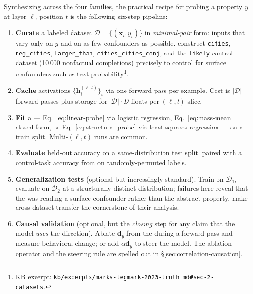Synthesizing across the four  families, the practical recipe for
probing a property $y$ at layer $\ell$, position $t$ is the following
six-step pipeline:
\begin{enumerate}
  \item \textbf{Curate} a labeled dataset
    $\mathcal{D} = \{(\mathbf{x}_i, y_i)\}$ in \emph{minimal-pair} form:
    inputs that vary only on $y$ and on as few confounders as possible.
    \citet[\S 2]{marks-tegmark-2023-truth} construct
    \texttt{cities}, \texttt{neg\_cities}, \texttt{larger\_than},
    \texttt{cities\_cities\_conj}, and the \texttt{likely} control
    dataset (10\,000 nonfactual completions) precisely to control for
    surface confounders such as text probability\footnote{KB excerpt:
    \nolinkurl{kb/excerpts/marks-tegmark-2023-truth.md#sec-2-datasets}.}.
  \item \textbf{Cache} activations $\{\mathbf{h}^{(\ell, t)}_i\}_i$ via
    one forward pass per example. Cost is $|\mathcal{D}|$ forward
    passes plus storage for $|\mathcal{D}| \cdot D$ floats per
    $(\ell, t)$ slice.
  \item \textbf{Fit} a  — Eq.~\eqref{eq:linear-probe} via logistic
    regression, Eq.~\eqref{eq:mass-mean} closed-form, or
    Eq.~\eqref{eq:structural-probe} via least-squares regression — on a
    train split. Multi-$(\ell, t)$ runs are common.
  \item \textbf{Evaluate} held-out accuracy on a same-distribution test
    split, paired with a control-task accuracy from
    \citet{hewitt2019-control-tasks} on randomly-permuted labels.
  \item \textbf{Generalization tests} (optional but increasingly
    standard). Train on $\mathcal{D}_1$, evaluate on $\mathcal{D}_2$ at
    a structurally distinct distribution; failures here reveal that
    the  was reading a surface confounder rather than the abstract
    property. \citet[\S 1, \S 4]{marks-tegmark-2023-truth} make
    cross-dataset transfer the cornerstone of their analysis.
  \item \textbf{Causal validation} (optional, but the \emph{closing}
    step for any claim that the model \emph{uses} the  direction).
    Ablate $\mathbf{d}_y$ from the  during a forward pass
    and measure behavioral change; or add $\alpha \hat{\mathbf{d}}_y$
    to steer the model. The ablation operator and the steering rule
    are spelled out in \S\ref{sec:correlation-causation}.
\end{enumerate}

